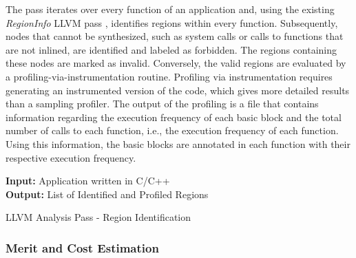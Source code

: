 \documentclass[]{usiinfthesis}
\begin{document}
The pass iterates over every function of an
 application and, using the existing \emph{RegionInfo} LLVM pass 
\cite{GrosserApr12}, identifies regions within every function.
Subsequently, nodes that cannot be synthesized, such as system
calls or calls to functions that are not inlined, are identified 
and labeled as forbidden.
The regions containing
these nodes are marked as invalid. Conversely, the valid regions are 
evaluated by a profiling-via-instrumentation routine.
Profiling via
instrumentation requires generating an instrumented version of the
code, which gives more detailed results than a sampling
profiler. 
The output of the profiling is a file that contains information regarding 
the execution frequency of each basic block and the total number of calls to each 
function, i.e., the execution frequency of each function.
Using this information, the basic blocks are annotated
 in each function with their respective execution frequency. 


\begin{algorithm}[t]
\begin{flushleft}
\textbf{Input:}  Application written in C/C++\\
\textbf{Output:} List of Identified and Profiled Regions\\
\end{flushleft}
\begin{algorithmic}[1]
\State{}
\State{}
      \State{}
    \EndIf
  \EndFor
\EndFunction

\State
{}
    \State{}
  \EndFor
\EndFunction
\end{algorithmic}
\caption{LLVM Analysis Pass - Region Identification} 
\label{algo:reg}
\end{algorithm}

\subsubsection{Merit and Cost Estimation}
\label{subsec:mer_cost}
\end{document}
